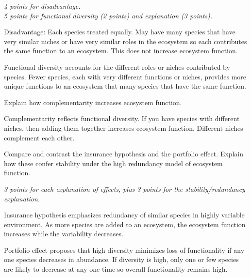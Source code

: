 \documentclass[12pt, addpoints]{exam}
\newcommand*\AnswerBox[2]{%
    \parbox[t][#1]{0.92\textwidth}{%
    \begin{solution}#2\end{solution}}
    \vspace{\stretch{1}}
}
\newenvironment{AnswerPage}[1]
    {\begin{minipage}[t][#1]{0.92\textwidth}%
    \begin{solution}}
    {\end{solution}\end{minipage}
    \vspace{\stretch{1}}}
\begin{document}
\begin{questions}
	\begin{AnswerPage}{0.6\textheight}%

	\emph{4 points for disadvantage.\\
	5 points for functional diversity (2 points) and explanation (3 points).}

	\vspace*{\baselineskip}

	Disadvantage: Each species treated equally. May have many species that have very similar niches or have very similar roles in the ecosystem so each contributes the same function to an ecosystem. This does not increase ecosystem function.
	
	\vspace*{\baselineskip}

	Functional diversity accounts for the different roles or niches contributed by species. Fewer species, each with very different functions or niches, provides more unique functions to an ecosystem that many species that have the same function.  

	\end{AnswerPage}

\question[5]
Explain how complementarity increases ecosystem function.

	\AnswerBox{0.15\textheight}{%
	Complementarity reflects functional diversity. If you have species with different niches, then adding them together increases ecosystem function. Different niches complement each other.
}

\newpage

\question[10]
Compare and contrast the insurance hypothesis and the portfolio effect.  Explain how these confer stability under the high redundancy model of ecosystem function.

	\begin{AnswerPage}{0.4\textheight}%
	\emph{3 points for each explanation of effects, plus 3 points for the stability/redundancy explanation.}

	\vspace*{\baselineskip}
	
	Insurance hypothesis emphasizes redundancy of similar species in highly variable environment. As more species are added to an ecosystem, the ecosystem function increases while the variability decreases.
	
	\vspace*{\baselineskip}
	
	Portfolio effect proposes that high diversity minimizes loss of functionality if any one species decreases in abundance. If diversity is high, only one or few species are likely to decrease at any one time so overall functionality remains high.
	

\end{AnswerPage}
\end{questions}
\end{document}
